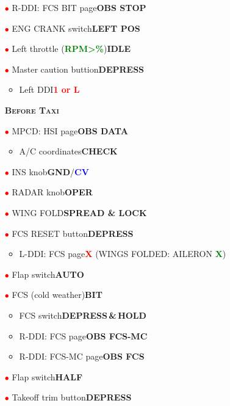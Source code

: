 \documentclass[a4paper,12pt,dvipsnames]{letter}
\newcommand{\button}[1]{\textbf{#1}}
\newcommand{\ok}[1]{\textcolor{Green}{\textbf{#1}}}
\newcommand{\boat}[1]{\textcolor{Blue}{\textbf{#1}}}
\newcommand{\warn}[1]{\textcolor{Red}{\textbf{#1}}}
\newcommand{\myHead}[1]{{\LARGE\textsc{\textbf{#1}}}}
\newcommand{\ri}{\textcolor{red}{$\bullet$\;}}
\begin{document}
{\begin{itemize}
\begin{itemize}
 \end{itemize}
 \item[\ri] R-DDI: FCS BIT page\dotfill\button{OBS STOP}
 \item[\ri] ENG CRANK switch\dotfill\button{LEFT POS}
 \item[\ri] Left throttle (\ok{RPM\;>\%})\dotfill\button{IDLE}
 \item[\ri] Master caution buttion\dotfill\button{DEPRESS}
 \begin{itemize}
  \item Left DDI\dotfill\warn{1 or L}
 \end{itemize} 
\end{itemize}
\newpage
\begin{itemize}
 \item[] \myHead{Before Taxi}
 \item[\ri] MPCD: HSI page\dotfill\button{OBS DATA}
 \begin{itemize}
  \item A/C coordinates\dotfill\button{CHECK}
 \end{itemize} 
 \item[\ri] INS knob\dotfill\button{GND}/\boat{CV}
 \item[\ri] RADAR knob\dotfill\button{OPER}
 \item[\ri] WING FOLD\dotfill\button{SPREAD \& LOCK}
 \item[\ri] FCS RESET button\dotfill\button{DEPRESS}
 \begin{itemize}
  \item L-DDI: FCS page\dotfill\warn{X} (WINGS FOLDED: AILERON \ok{X})
 \end{itemize}
 \item[\ri] Flap switch\dotfill\button{AUTO}
 \item[\ri] FCS (cold weather)\dotfill\button{BIT}
 \begin{itemize}
  \item FCS switch\dotfill\button{DEPRESS\,\&\,HOLD}
  \item R-DDI: FCS page\dotfill\button{OBS FCS-MC}
  \item R-DDI: FCS-MC page\dotfill\button{OBS FCS}
 \end{itemize}
 \item[\ri] Flap switch\dotfill\button{HALF}
 \item[\ri] Takeoff trim button\dotfill\button{DEPRESS}

\end{itemize}}
\end{document}
